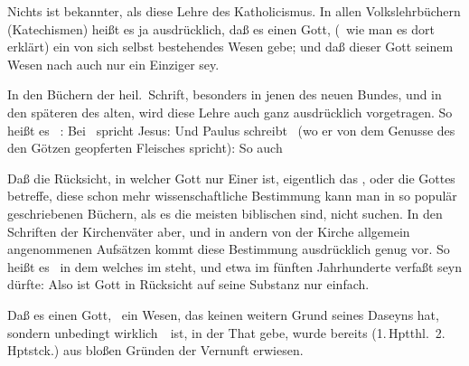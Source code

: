\begin{aufza}
\item Nichts ist bekannter, als diese Lehre des Katholicismus. In allen Volkslehrbüchern (Katechismen) heißt es ja ausdrücklich, daß es einen Gott, (\dh\ wie man es dort erklärt) ein von sich selbst bestehendes Wesen gebe; und daß dieser Gott seinem Wesen nach auch nur ein Einziger sey.
\item In den Büchern der heil.\ Schrift, besonders in jenen des neuen Bundes, und in den späteren des alten, wird diese Lehre auch ganz ausdrücklich vorgetragen. So heißt es \zB\ :  Bei \ spricht Jesus:  Und Paulus schreibt \ (wo er von dem Genusse des den Götzen geopferten Fleisches spricht):  So auch \ \ \ \uma\ 
\item Daß die Rücksicht, in welcher Gott nur Einer ist, eigentlich das , oder die  Gottes betreffe, diese schon mehr wissenschaftliche Bestimmung kann man in so populär geschriebenen Büchern, als es die meisten biblischen sind, nicht suchen. In den Schriften der Kirchenväter aber, und in andern von der Kirche allgemein angenommenen Aufsätzen kommt diese Bestimmung ausdrücklich genug vor. So heißt es \zB\ in dem  welches im  steht, und etwa im fünften Jahrhunderte verfaßt seyn dürfte:  Also ist Gott in Rücksicht auf seine Substanz nur einfach.
\end{aufza}

Daß es einen Gott, \dh\ ein Wesen, das keinen weitern Grund seines Daseyns hat, sondern unbedingt wirklich~\ ist, in der That gebe, wurde bereits (1.\,Hptthl.\ 2.\,Hptstck.) aus bloßen Gründen der Vernunft erwiesen.

